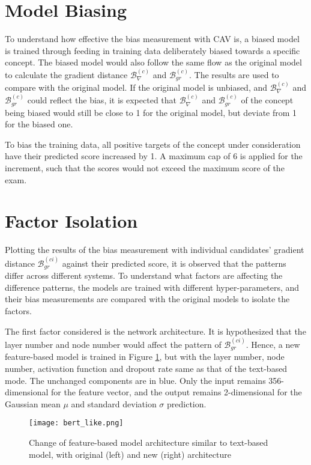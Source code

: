 \section{Model Biasing}
To understand how effective the bias measurement with CAV is, a biased model is trained through feeding in training data deliberately biased towards a specific concept. The biased model would also follow the same flow as the original model to calculate the gradient distance $\mathcal{B}^{(c)}_{\nabla}$ and $\mathcal{B}^{(c)}_{gr}$. The results are used to compare with the original model. If the original model is unbiased, and $\mathcal{B}^{(c)}_{\nabla}$ and $\mathcal{B}^{(c)}_{gr}$ could reflect the bias, it is expected that $\mathcal{B}^{(c)}_{\nabla}$ and $\mathcal{B}^{(c)}_{gr}$ of the concept being biased would still be close to 1 for the original model, but deviate from 1 for the biased one.

To bias the training data, all positive targets of the concept under consideration have their predicted score increased by 1. A maximum cap of 6 is applied for the increment, such that the scores would not exceed the maximum score of the exam.

\section{Factor Isolation}
Plotting the results of the bias measurement with individual candidates' gradient distance $\mathcal{B}^{(ci)}_{gr}$ against their predicted score, it is observed that the patterns differ across different systems. To understand what factors are affecting the difference patterns, the models are trained with different hyper-parameters, and their bias measurements are compared with the original models to isolate the factors.

The first factor considered is the network architecture. It is hypothesized that the layer number and node number would affect the pattern of $\mathcal{B}^{(ci)}_{gr}$. Hence, a new feature-based model is trained in Figure \ref{fig:bert_like}, but with the layer number, node number, activation function and dropout rate same as that of the text-based mode. The unchanged components are in blue. Only the input remains 356-dimensional for the feature vector, and the output remains 2-dimensional for the Gaussian mean $\mu$ and standard deviation $\sigma$ prediction.

\begin{figure}[H]
  \centering
  \texttt{[image: bert\_like.png]}
  \caption{Change of feature-based model architecture similar to text-based model, with original (left) and new (right) architecture}
  \label{fig:bert_like}
\end{figure}

